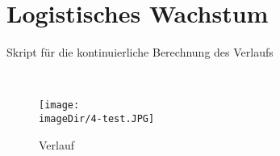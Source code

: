 \section{Logistisches Wachstum}
\begin{code}
	\caption{Skript für die kontinuierliche Berechnung des Verlaufs}
	\label{source:3-script}
\end{code}
\ \newpage
\begin{figure}[h]
	\centering
	\texttt{[image: \\imageDir/4-test.JPG]}
	\caption{Verlauf}
	\label{fig:3-test}
\end{figure}